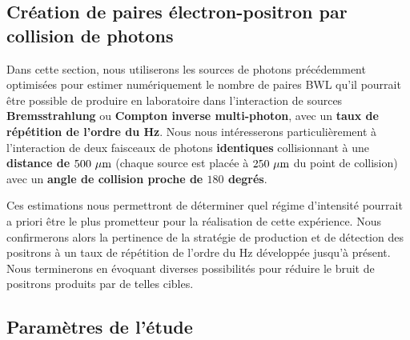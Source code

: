 \begin{refsection}
\section{Création de paires électron-positron par collision de photons}


Dans cette section, nous utiliserons les sources de photons précédemment optimisées pour estimer numériquement le nombre de paires BWL qu'il pourrait être possible de produire en laboratoire dans l'interaction de sources \textbf{Bremsstrahlung} ou \textbf{Compton inverse multi-photon}, avec un \textbf{taux de répétition de l'ordre du Hz}. Nous nous intéresserons particulièrement à l'interaction de deux faisceaux de photons \textbf{identiques} collisionnant à une \textbf{distance de $500 ~ \rm \mu m$} (chaque source est placée à $250 ~ \rm \mu m$ du point de collision) avec un \textbf{angle de collision proche de $180$ degrés}.

Ces estimations nous permettront de déterminer quel régime d'intensité pourrait a priori être le plus prometteur pour la réalisation de cette expérience. Nous confirmerons alors la pertinence de la stratégie de production et de détection des positrons à un taux de répétition de l'ordre du Hz développée jusqu'à présent. Nous terminerons en évoquant diverses possibilités pour réduire le bruit de positrons produits par de telles cibles.

\subsection{Paramètres de l'étude}


\end{refsection}
